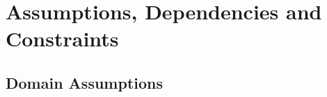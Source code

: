\documentclass[../../rasd.tex]{subfiles}
\begin{document}
\section{Assumptions, Dependencies and Constraints}
	\subsection{Domain Assumptions}
	 	
\end{document}
